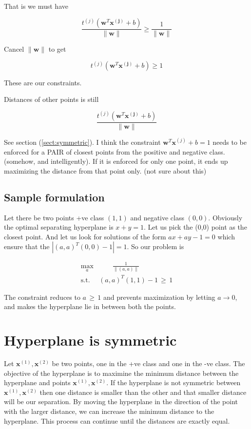 \documentclass{article}
\newcommand{\beq}{\begin{equation}}
\newcommand{\eeq}{\end{equation}}
\newcommand{\ber}{\begin{eqnarray}}
\newcommand{\eer}{\end{eqnarray}}
\begin{document}
That is we must have

\beq
\frac{t^{(j)}(\pmb{w}^T\pmb{x^{(j)}}+b)}{\|\pmb{w}\|} \ge \frac{1}{\|\pmb{w}\|}
\eeq

Cancel $\|\pmb{w}\|$ to get


\beq
{t^{(j)}(\pmb{w}^T\pmb{x^{(j)}}+b)} \ge 1
\eeq

These are our constraints.

Distances of other points is still

\beq
\frac{t^{(j)}(\pmb{w}^T\pmb{x^{(j)}}+b)}{\|\pmb{w}\|} 
\eeq

See section (\ref{sect:symmetric}). I think the constraint $\pmb{w}^T\pmb{x}^{(j)}+b=1$ needs to be enforced for a PAIR of closest points from the positive and negative class. (somehow, and intelligently). If it is enforced for only one point, it ends up maximizing the distance from that point only. (not sure about this)

\subsection{Sample formulation}
Let there be two points +ve class $(1,1)$ and negative class $(0,0)$. Obviously the optimal separating hyperplane is $x+y=1$. Let us pick the (0,0) point as the closest point. And let us look for solutions of the form $ax+ay-1=0$ which ensure that the $|(a,a)^T(0,0)-1|=1$. So our problem is

\ber
\max_{a} &  \qquad \frac{1}{\|(a,a)\|}\\
\text{s.t.} & (a,a)^T(1,1)-1 \,\ge\, 1
\eer

The constraint reduces to $a\,\ge\,1$ and prevents maximization by letting $a\rightarrow{0}$, and makes the hyperplane lie in between both the points.
 

\section{\label{sect:symmetric}Hyperplane is symmetric}
Let $\pmb{x}^{(1)},\pmb{x}^{(2)}$ be two points, one in the +ve class and one in the -ve class. The objective of the hyperplane is to maximine the minimum distance between the hyperplane and points $\pmb{x}^{(1)},\pmb{x}^{(2)}$. If the hyperplane is not symmetric between $\pmb{x}^{(1)},\pmb{x}^{(2)}$ then one distance is smaller than the other and that smaller distance will be our separation. By moving the hyperplane in the direction of the point with the larger distance, we can increase the minimum distance to the hyperplane. This process can continue until the distances are exactly equal.
\end{document}
